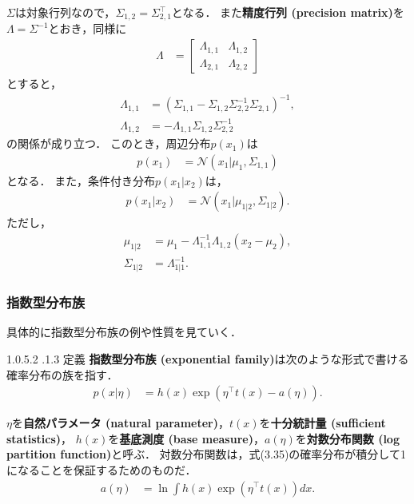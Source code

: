 \documentclass[11pt,a4paper]{jsarticle}
\makeatletter
\numberwithin{equation}{section}
\newcommand{\subsubsubsection}{\@startsection{paragraph}{4}{\z@}%
	{1.0\Cvs \@plus.5\Cdp \@minus.2\Cdp}%
	{.1\Cvs \@plus.3\Cdp}%
	{\reset@font\sffamily\normalsize}
}
\makeatother
\begin{document}
$\Sigma$は対象行列なので，$\Sigma_{1, 2} = \Sigma_{2, 1}^\top$となる．
また\textbf{精度行列 (precision matrix)}を$\Lambda = \Sigma^{-1}$とおき，同様に
\begin{align}
\Lambda
& =
\begin{bmatrix}
\Lambda_{1, 1} & \Lambda_{1, 2} \\
\Lambda_{2, 1} & \Lambda_{2, 2}
\end{bmatrix}
\end{align}
とすると，
\begin{align}
\Lambda_{1, 1}
& =
(\Sigma_{1, 1} - \Sigma_{1, 2} \Sigma_{2, 2}^{-1} \Sigma_{2, 1})^{-1}, \\
\Lambda_{1, 2}
& =
-\Lambda_{1, 1} \Sigma_{1, 2} \Sigma_{2, 2}^{-1}
\end{align}
の関係が成り立つ．
このとき，周辺分布$p(x_1)$は
\begin{align}
p(x_1)
& =
\mathcal{N} (x_1 | \mu_1, \Sigma_{1, 1})
\end{align}
となる．
また，条件付き分布$p(x_1 | x_2)$は，
\begin{align}
p(x_1 | x_2)
& =
\mathcal{N} (x_1 | \mu_{1|2}, \Sigma_{1|2}).
\end{align}
ただし，
\begin{align}
\mu_{1|2}
& =
\mu_1 - \Lambda_{1, 1}^{-1} \Lambda_{1, 2} (x_2 - \mu_2), \\
\Sigma_{1|2}
& =
\Lambda_{1|1}^{-1}.
\end{align}

\subsubsection{指数型分布族}
具体的に指数型分布族の例や性質を見ていく．

\subsubsubsection{定義}
\textbf{指数型分布族 (exponential family)}は次のような形式で書ける確率分布の族を指す．
\begin{align}
p(x | \eta)
& =
h(x) \exp (\eta^\top t(x) - a(\eta)).
\end{align}

$\eta$を\textbf{自然パラメータ (natural parameter)}，$t(x)$を\textbf{十分統計量 (sufficient statistics)}，
$h(x)$を\textbf{基底測度 (base measure)}，$a(\eta)$を\textbf{対数分布関数 (log partition function)}と呼ぶ．
対数分布関数は，式(3.35)の確率分布が積分して1になることを保証するためのものだ．
\begin{align}
a(\eta)
& =
\ln \int h(x) \exp (\eta^\top t(x)) dx.
\end{align}
\end{document}
